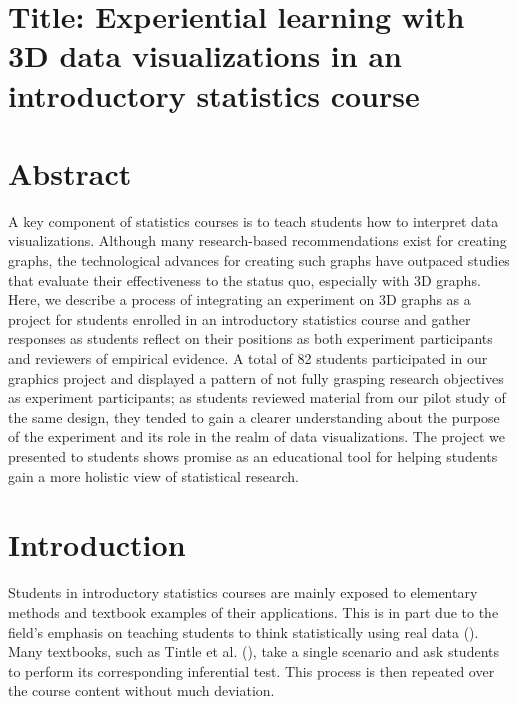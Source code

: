 \documentclass[
]{article}
\date{}
\begin{document}
\section{Title: Experiential learning with 3D data visualizations in an
introductory statistics
course}\label{title-experiential-learning-with-3d-data-visualizations-in-an-introductory-statistics-course}

\section{Abstract}\label{abstract}

A key component of statistics courses is to teach students how to
interpret data visualizations. Although many research-based
recommendations exist for creating graphs, the technological advances
for creating such graphs have outpaced studies that evaluate their
effectiveness to the status quo, especially with 3D graphs. Here, we
describe a process of integrating an experiment on 3D graphs as a
project for students enrolled in an introductory statistics course and
gather responses as students reflect on their positions as both
experiment participants and reviewers of empirical evidence. A total of
82 students participated in our graphics project and displayed a pattern
of not fully grasping research objectives as experiment participants; as
students reviewed material from our pilot study of the same design, they
tended to gain a clearer understanding about the purpose of the
experiment and its role in the realm of data visualizations. The project
we presented to students shows promise as an educational tool for
helping students gain a more holistic view of statistical research.

\section{Introduction}\label{introduction}

Students in introductory statistics courses are mainly exposed to
elementary methods and textbook examples of their applications. This is
in part due to the field's emphasis on teaching students to think
statistically using real data (). Many textbooks, such as Tintle et al.
(), take a single scenario and ask
students to perform its corresponding inferential test. This process is
then repeated over the course content without much deviation.
\end{document}
